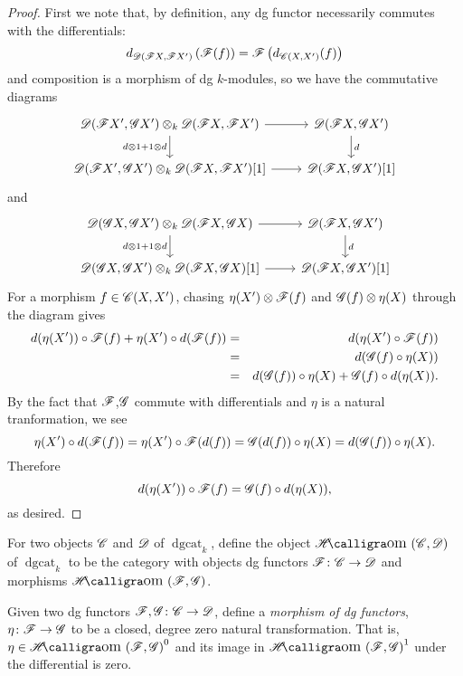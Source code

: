 \documentclass[dissertation.tex]{subfiles}
\begin{document}
\begin{prop}
\begin{proof}
            First we note that, by definition, any dg functor necessarily commutes with the differentials:
            $$d_{\mathscr{D}(\mathscr{F}X, \mathscr{F}X^\prime)}\left(\mathscr{F}(f) \right) = \mathscr{F}\left(d_{\mathscr{C}(X,X^\prime)}(f)\right)$$
            and composition is a morphism of dg $k$-modules, so we have the commutative diagrams
            $$\begin{tikzcd}
              \D(\F X^\prime, \G X^\prime) \otimes_k \D(\F X, \F X^\prime) \arrow{r}\arrow[swap]{d}{d \otimes 1 + 1 \otimes d}& \D(\F X, \G X^\prime)\arrow{d}{d}\\
              \D(\F X^\prime, \G X^\prime) \otimes_k \D(\F X, \F X^\prime)[1] \arrow{r}& \D(\F X, \G X^\prime)[1]
            \end{tikzcd}$$
            and
            $$\begin{tikzcd}
              \D(\G X, \G X^\prime) \otimes_k \D(\F X, \G X) \arrow{r}\arrow[swap]{d}{d \otimes 1 + 1 \otimes d}& \D(\F X, \G X^\prime)\arrow{d}{d}\\
              \D(\G X, \G X^\prime) \otimes_k \D(\F X, \G X)[1] \arrow{r}& \D(\F X, \G X^\prime)[1]
            \end{tikzcd}$$
            For a morphism $f \in \mathscr{C}(X,X^\prime)$, chasing $\eta(X^\prime) \otimes \mathscr{F}(f)$ and $\mathscr{G}(f) \otimes \eta(X)$ through the diagram gives
            \begin{eqnarray*}
              d(\eta(X^\prime)) \circ \mathscr{F}(f) + \eta(X^\prime) \circ d(\mathscr{F}(f)) 
              &=& d(\eta(X^\prime) \circ \mathscr{F}(f))\\
              &=& d(\mathscr{G}(f) \circ \eta(X))\\
              &=& d(\mathscr{G}(f)) \circ \eta(X) + \mathscr{G}(f) \circ d(\eta(X)).
            \end{eqnarray*}
            By the fact that $\mathscr{F}$,$\mathscr{G}$ commute with differentials and $\eta$ is a natural tranformation, we see
            $$\eta(X^\prime) \circ d(\mathscr{F}(f)) = \eta(X^\prime) \circ \mathscr{F}(d(f)) = \mathscr{G}(d(f)) \circ \eta(X) = d(\mathscr{G}(f)) \circ \eta(X).$$
            Therefore
            $$d(\eta(X^\prime)) \circ \mathscr{F}(f) = \mathscr{G}(f) \circ d(\eta(X)),$$
            as desired.
          \end{proof}
        \end{prop}

        \begin{defn}
          For two objects $\mathscr{C}$ and $\mathscr{D}$ of $\operatorname{dgcat}_k$, define the object $\SHom{\CC,\D}$ of $\operatorname{dgcat}_k$ to be the category with objects dg functors $\mathscr{F} \colon \mathscr{C} \rightarrow \mathscr{D}$ and morphisms $\SHom{\mathscr{F},\mathscr{G}}$.
          
          Given two dg functors $\mathscr{F},\mathscr{G} \colon \mathscr{C} \rightarrow \mathscr{D}$, define a {\it morphism of dg functors}, $\eta \colon \mathscr{F} \rightarrow \mathscr{G}$ to be a closed, degree zero natural transformation.
          That is, $\eta \in \SHom{\F, \G}^0$ and its image in $\SHom{\F,\G}^1$ under the differential is zero.
        \end{defn}
\end{document}
